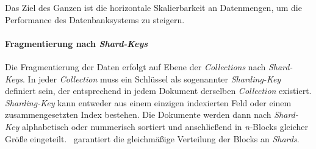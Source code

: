 Das Ziel des Ganzen ist die horizontale Skalierbarkeit an Datenmengen, um die Performance des Datenbanksystems zu steigern.

\paragraph{Fragmentierung nach \textit{Shard-Keys}}\label{sharding-keys}
Die Fragmentierung der Daten erfolgt auf Ebene der \textit{Collections} nach \textit{Shard-Keys}. In jeder \textit{Collection}  muss ein Schlüssel als sogenannter \textit{Sharding-Key} definiert sein, der entsprechend in jedem Dokument derselben \textit{Collection} existiert.  \textit{Sharding-Key} kann entweder aus einem einzigen indexierten Feld oder einem zusammengesetzten Index bestehen. Die Dokumente werden dann nach \textit{Shard-Key} alphabetisch oder nummerisch sortiert und anschließend in \textit{n-}Blocks gleicher Größe eingeteilt. \mongo\ garantiert die gleichmäßige Verteilung der Blocks an \textit{Shards}.

